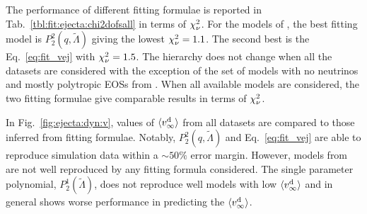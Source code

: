 The performance of different fitting formulae is reported in 
Tab.~\ref{tbl:fit:ejecta:chi2dofsall} in terms of $\chi_{\nu}^2$.
%
For the models of \DSrefset{}, the best fitting model is $P_2^2(q,\tilde\Lambda)$ giving the lowest 
$\chi_{\nu}^2=1.1$. The second best is the Eq.~\eqref{eq:fit_vej} with $\chi_{\nu}^2=1.5$. 
The hierarchy does not change when all the datasets are considered with 
the exception of the set of models with no neutrinos and mostly polytropic 
\acp{EOS} from \citet{Bauswein:2013yna}. 
When all available models are considered,  
the two fitting formulae give comparable results in terms of $\chi_{\nu}^2$.




In Fig.~\ref{fig:ejecta:dyn:v}, values of $\langle v^{\text{d}}_\infty\rangle$ from all datasets 
are compared to those 
inferred from fitting formulae. Notably, $P_2^2(q,\tilde\Lambda)$ and  Eq.~\eqref{eq:fit_vej} are able to reproduce simulation data within a ${\sim}50\%$ 
error margin. However, models from \DSnone{} are not well reproduced by any fitting 
formula considered. The single parameter polynomial, $P_2^1(\tilde\Lambda)$, does not 
reproduce well models with low $\langle v^{\text{d}}_\infty\rangle$ and in general shows worse performance in 
predicting the $\langle v^{\text{d}}_\infty\rangle$.

%

